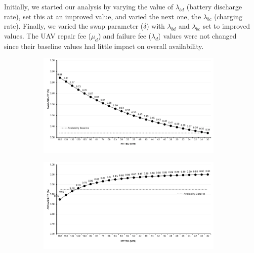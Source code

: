 \documentclass[conference]{IEEEtran}
\begin{document}
Initially, we started our analysis by varying the value of $\lambda_{bd}$ (battery discharge rate), set this at an improved value, and varied the next one, the $\lambda_{bc}$ (charging rate). Finally, we varied the swap parameter ($\delta$) with $\lambda_{bd}$ and $\lambda_{bc}$ set to improved values. The UAV repair fee ($\mu_{d}$) and failure fee ($\lambda_{d}$) values were not changed since their baseline values had little impact on overall availability.

\begin{figure}[htbp]
     \centering
     \begin{subfigure}[b]{0.45\textwidth}
         \includegraphics[width=\linewidth]{img/exps/SA_007.png}
         \caption{}
         \label{fig:ctmc_sa_bd}
     \end{subfigure}
     \hfill
     \begin{subfigure}[b]{0.45\textwidth}
         \centering
         \includegraphics[width=\linewidth]{img/exps/SA_001.png}
         \caption{}
         \label{fig:ctmc_sa_bc}
     \end{subfigure}
     \hfill
     \begin{subfigure}[b]{0.45\textwidth}

\end{subfigure}
\end{figure}
\end{document}
